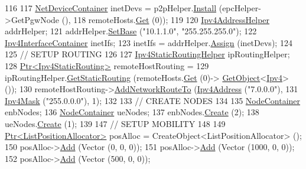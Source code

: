 \begin{DoxyCode}
116 
117   \hyperlink{classns3_1_1NetDeviceContainer}{NetDeviceContainer} inetDevs = p2pHelper.\hyperlink{classns3_1_1PointToPointHelper_ab9162fea3e88722666fed1106df1f9ec}{Install} (epcHelper->GetPgwNode (),
118       remoteHosts.\hyperlink{classns3_1_1NodeContainer_a9ed96e2ecc22e0f5a3d4842eb9bf90bf}{Get} (0));
119 
120   \hyperlink{classns3_1_1Ipv4AddressHelper}{Ipv4AddressHelper} addrHelper;
121   addrHelper.\hyperlink{classns3_1_1Ipv4AddressHelper_acf7b16dd25bac67e00f5e25f90a9a035}{SetBase} (\textcolor{stringliteral}{"10.1.1.0"}, \textcolor{stringliteral}{"255.255.255.0"});
122   \hyperlink{classns3_1_1Ipv4InterfaceContainer}{Ipv4InterfaceContainer} inetIfs;
123   inetIfs = addrHelper.\hyperlink{classns3_1_1Ipv4AddressHelper_af8e7f4a1a7e74c00014a1eac445a27af}{Assign} (inetDevs);
124 
125   \textcolor{comment}{// SETUP ROUTING}
126 
127   \hyperlink{classns3_1_1Ipv4StaticRoutingHelper}{Ipv4StaticRoutingHelper} ipRoutingHelper;
128   \hyperlink{classns3_1_1Ptr}{Ptr<Ipv4StaticRouting>} remoteHostRouting =
129       ipRoutingHelper.\hyperlink{classns3_1_1Ipv4StaticRoutingHelper_a731206e50d305695dac7fb2ef963a4bb}{GetStaticRouting} (remoteHosts.\hyperlink{classns3_1_1NodeContainer_a9ed96e2ecc22e0f5a3d4842eb9bf90bf}{Get} (0)->
      \hyperlink{classns3_1_1Object_a13e18c00017096c8381eb651d5bd0783}{GetObject}<\hyperlink{classns3_1_1Ipv4}{Ipv4}> ());
130   remoteHostRouting->\hyperlink{classns3_1_1Ipv4StaticRouting_a8bf5eaa7ba49fe33c78c70d5560b6c39}{AddNetworkRouteTo} (\hyperlink{classns3_1_1Ipv4Address}{Ipv4Address} (\textcolor{stringliteral}{"7.0.0.0"}),
131       \hyperlink{classns3_1_1Ipv4Mask}{Ipv4Mask} (\textcolor{stringliteral}{"255.0.0.0"}), 1);
132 
133   \textcolor{comment}{// CREATE NODES}
134 
135   \hyperlink{classns3_1_1NodeContainer}{NodeContainer} enbNodes;
136   \hyperlink{classns3_1_1NodeContainer}{NodeContainer} ueNodes;
137   enbNodes.\hyperlink{classns3_1_1NodeContainer_a787f059e2813e8b951cc6914d11dfe69}{Create} (2);
138   ueNodes.\hyperlink{classns3_1_1NodeContainer_a787f059e2813e8b951cc6914d11dfe69}{Create} (1);
139 
147   \textcolor{comment}{// SETUP MOBILITY}
148 
149   \hyperlink{classns3_1_1Ptr}{Ptr<ListPositionAllocator>} posAlloc = CreateObject<ListPositionAllocator> ();
150   posAlloc->\hyperlink{classns3_1_1ListPositionAllocator_a460e82f015ac012a73ba0ea0cccb3486}{Add} (Vector (0, 0, 0));
151   posAlloc->\hyperlink{classns3_1_1ListPositionAllocator_a460e82f015ac012a73ba0ea0cccb3486}{Add} (Vector (1000, 0, 0));
152   posAlloc->\hyperlink{classns3_1_1ListPositionAllocator_a460e82f015ac012a73ba0ea0cccb3486}{Add} (Vector (500, 0, 0));

\end{DoxyCode}
